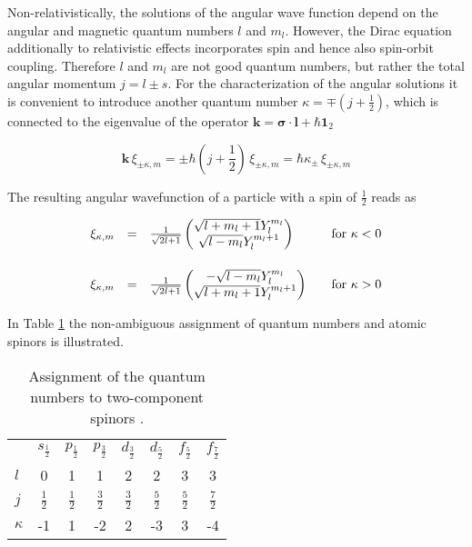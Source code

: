 Non-relativistically, the solutions
of the angular wave function depend on the angular and magnetic quantum numbers
$l$ and $m_l$. However, the Dirac equation additionally to relativistic effects
incorporates spin and hence also spin-orbit coupling. Therefore $l$ and $m_l$ are
not good quantum numbers, but rather the total angular momentum $j=l\pm s$.
For the characterization of the angular solutions it is convenient
to introduce another quantum number $\kappa=\mp(j+\frac12)$, which is connected
to the eigenvalue of the operator
$\mathbf{k}= \boldsymbol{\sigma}\cdot \mathbf{l} + \hbar \mathbf{1}_2$

\begin{equation}
 \mathbf{k} \, \xi_{\pm \kappa,m} = \pm \hbar (j+\frac12) \, \xi_{\pm \kappa,m}
 = \hbar \kappa_\pm \, \xi_{\pm \kappa,m}
\end{equation}


The resulting angular wavefunction of a particle with a spin of $\frac12$ reads as

\begin{equation}\begin{array}{rcll}
\xi_{\kappa,m} &=& \frac1{\sqrt{2l+1}}\begin{pmatrix}\sqrt{l+m_l+1}Y_l^{m_l}\\\sqrt{l-m_l}Y_l^{m_l+1}\end{pmatrix} &\quad\text{for }\kappa<0\\\vphantom{\rule{0pt}{30pt}}
\xi_{\kappa,m} &=& \frac1{\sqrt{2l+1}}\begin{pmatrix}-\sqrt{l-m_l}Y_l^{m_l}\\\sqrt{l+m_l+1}Y_l^{m_l+1}\end{pmatrix} &\quad\text{for }\kappa>0\\
\end{array}\end{equation}

In Table \ref{qzspinor} the non-ambiguous assignment of quantum numbers and atomic
spinors is illustrated.

\begin{table}[h]
\centering
\begin{tabular}{lccccccc}
\toprule
        & $s_{\frac12}$ & $p_{\frac12}$ & $p_{\frac32}$ & $d_{\frac32}$ & $d_{\frac52}$ & $f_{\frac52}$ & $f_{\frac72}$\\\vphantom{\rule{0pt}{20pt}}
$l$     & 0            & 1           & 1            & 2            & 2            & 3            & 3\\\vphantom{\rule{0pt}{20pt}}
$j$     & $\frac12$    & $\frac12$   & $\frac32$    & $\frac32$    & $\frac52$    & $\frac52$    & $\frac72$\\\vphantom{\rule{0pt}{20pt}}
$\kappa$& -1           & 1           & -2           & 2            & -3           & 3            & -4\\
\bottomrule
\end{tabular}
\caption{Assignment of the quantum numbers to two-component spinors \cite{dyallfaegri}.}
\label{qzspinor}
\end{table}

